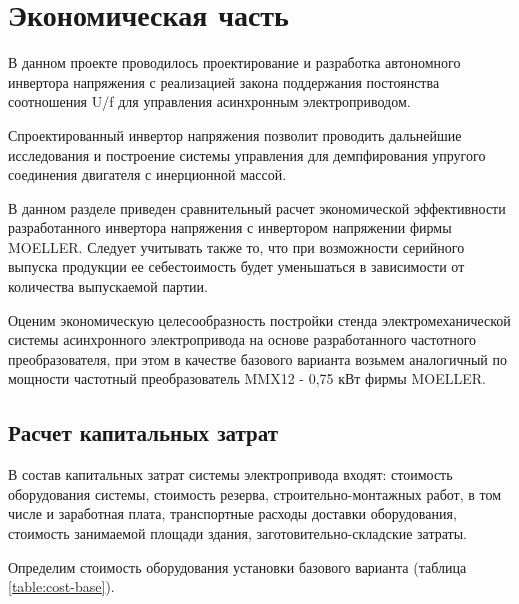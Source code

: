 \section{Экономическая часть}
        В данном проекте проводилось проектирование и разработка автономного
        инвертора напряжения с реализацией закона поддержания постоянства
        соотношения U/f для управления асинхронным электроприводом.

        Спроектированный инвертор напряжения позволит проводить дальнейшие
        исследования и построение системы управления для демпфирования упругого
        соединения двигателя с инерционной массой. 

        В данном разделе приведен сравнительный расчет экономической
        эффективности разработанного инвертора напряжения с инвертором
        напряжении фирмы MOELLER. Следует учитывать также то, что при
        возможности серийного выпуска продукции ее себестоимость будет
        уменьшаться в зависимости от количества выпускаемой партии.

        Оценим экономическую целесообразность постройки стенда
        электромеханической системы асинхронного электропривода на основе
        разработанного частотного преобразователя, при этом в качестве базового
        варианта возьмем аналогичный по мощности частотный преобразователь
        MMX12 - 0,75 кВт фирмы MOELLER.

    \subsection{Расчет капитальных затрат}
        В состав капитальных затрат системы электропривода входят: стоимость
        оборудования системы, стоимость резерва, строительно-монтажных работ, в
        том числе и заработная плата, транспортные расходы доставки
        оборудования, стоимость занимаемой площади здания,
        заготовительно-складские затраты.

        Определим стоимость оборудования установки базового варианта (таблица
        \ref{table:cost-base}).

